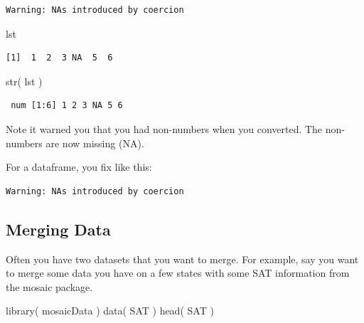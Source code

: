 \documentclass[
  letterpaper,
  DIV=11,
  numbers=noendperiod]{scrreprt}
\newenvironment{Shaded}{\begin{snugshade}}{\end{snugshade}}
\newcommand{\FunctionTok}[1]{\textcolor[rgb]{0.02,0.16,0.49}{#1}}
\newcommand{\NormalTok}[1]{\textcolor[rgb]{0.00,0.44,0.13}{#1}}
\newcommand{\OtherTok}[1]{\textcolor[rgb]{0.00,0.44,0.13}{#1}}
\newcommand{\SpecialCharTok}[1]{\textcolor[rgb]{0.25,0.44,0.63}{#1}}
\begin{document}
\begin{verbatim}
Warning: NAs introduced by coercion
\end{verbatim}

\begin{Shaded}
\begin{Highlighting}[]
\NormalTok{lst}
\end{Highlighting}
\end{Shaded}

\begin{verbatim}
[1]  1  2  3 NA  5  6
\end{verbatim}

\begin{Shaded}
\begin{Highlighting}[]
\FunctionTok{str}\NormalTok{( lst )}
\end{Highlighting}
\end{Shaded}

\begin{verbatim}
 num [1:6] 1 2 3 NA 5 6
\end{verbatim}

Note it warned you that you had non-numbers when you converted. The
non-numbers are now missing (NA).

For a dataframe, you fix like this:

\begin{Shaded}
\end{Shaded}

\begin{verbatim}
Warning: NAs introduced by coercion
\end{verbatim}

\hypertarget{merging-data}{%
\subsection{Merging Data}\label{merging-data}}

Often you have two datasets that you want to merge. For example, say you
want to merge some data you have on a few states with some SAT
information from the mosaic package.

\begin{Shaded}
\begin{Highlighting}[]
\FunctionTok{library}\NormalTok{( mosaicData )}
\FunctionTok{data}\NormalTok{( SAT )}
\FunctionTok{head}\NormalTok{( SAT )}
\end{Highlighting}
\end{Shaded}
\end{document}
